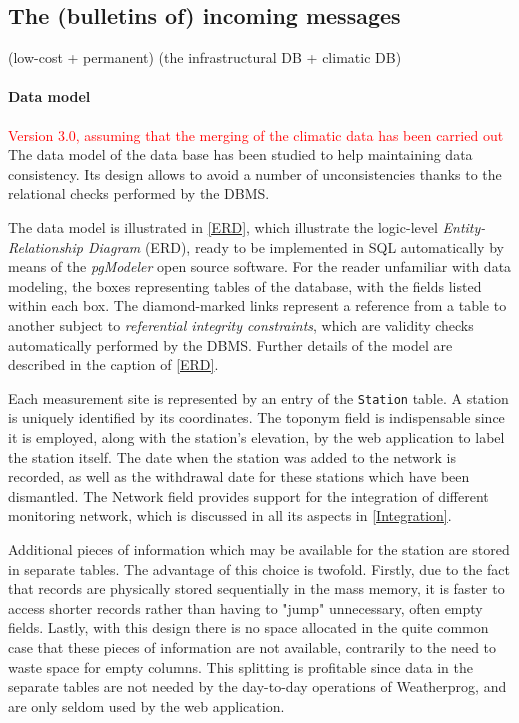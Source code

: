 \documentclass[authoryear,preprint,review,12pt]{elsarticle}
\begin{document}
\subsection{The (bulletins of) incoming messages}\label{decode}
(low-cost + permanent) (the infrastructural DB + climatic DB)\\

\paragraph{Data model}\textcolor{Red}{Version 3.0, assuming that the merging of the climatic data has been carried out} The data model of the data base has been studied to help maintaining data consistency. Its design allows to avoid a number of unconsistencies thanks to the relational checks performed by the DBMS. 

The data model is illustrated in  \cref{ERD}, which illustrate the logic-level \emph{Entity-Relationship Diagram} (ERD), ready to be implemented in SQL automatically by means of the \emph{pgModeler} \citep{pgmodeler} open source software. For the reader unfamiliar with data modeling, the boxes representing tables of the database, with the fields listed within each box. The diamond-marked links represent a reference from a table to another subject to \emph{referential integrity constraints}, which are validity checks automatically performed by the DBMS. Further details of the model are described in the caption of \cref{ERD}.

Each measurement site is represented by an entry of the \texttt{Station} table. A station is uniquely identified by its coordinates. The toponym field is indispensable since it is employed, along with the station's elevation, by the web application to label the station itself. The date when the station was added to the network is recorded, as well as the withdrawal date for these stations which have been dismantled. The Network field provides support for the integration of different monitoring network, which is discussed in all its aspects in \cref{Integration}.

Additional pieces of information which may be available for the station are stored in separate tables. The advantage of this choice is twofold. Firstly, due to the fact that records are physically stored sequentially in the mass memory,  it is faster to access shorter records rather than having to "jump" unnecessary, often empty fields. Lastly, with this design there is no space allocated in the quite common case that these pieces of information are not available, contrarily to the need to waste space for empty columns. This splitting is profitable since data in the separate tables are not needed by the day-to-day operations of Weatherprog, and are only seldom used by the web application.
\end{document}

